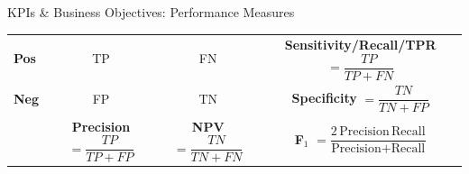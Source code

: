 \documentclass[ignorenonframetext,]{beamer}
\begin{document}
\begin{frame}{KPIs \& Business Objectives: Performance Measures}
{\begin{tabular}{|l|cc|c|}
\textbf{Pos}
  & \cellcolor[gray]{0.9}\rule{0pt}{3.5ex}TP
  & \cellcolor[gray]{0.9}FN
  & \cellcolor[gray]{0.9}\rule{0pt}{3.5ex}%
    \textbf{Sensitivity/Recall/TPR }%
    $=\dfrac{TP}{TP+FN}$ \\

\textbf{Neg}
  & \cellcolor[gray]{0.9}\rule{0pt}{3.5ex}FP
  & \cellcolor[gray]{0.9}TN
  & \cellcolor[gray]{0.9}\rule{0pt}{3.5ex}%
    \textbf{Specificity }%
    $=\dfrac{TN}{TN+FP}$ \\[0.8ex]
\hline
  & \cellcolor[gray]{0.9}\rule{0pt}{3.5ex}
      \textbf{Precision} $=\dfrac{TP}{TP+FP}$
  & \cellcolor[gray]{0.9}\rule{0pt}{3.5ex}
      \textbf{NPV} $=\dfrac{TN}{TN+FN}$
  & \cellcolor[gray]{0.9}\rule{0pt}{3.5ex}
      \textbf{F$_1$}%
        $=\dfrac{2\,\text{Precision}\,\text{Recall}}%
                {\text{Precision}+\text{Recall}}$
                \\[0.8ex]
\hline
\end{tabular}
}


\end{frame}






\end{document}
